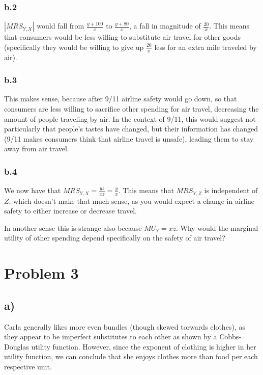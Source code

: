 \documentclass[12pt,letterpaper]{article}
\theoremstyle{definition}
\begin{document}
\subsubsection*{b.2}

$|MRS_{Y,X}|$ would fall from $\frac{y+100}{x}$ to $\frac{y+80}{x}$, a fall in magnitude of $\frac{20}{x}$.
This means that consumers would be less willing to substitute air travel for other goods (specifically they would be willing to give up $\frac{20}{x}$ less for an extra mile traveled by air).

\subsubsection*{b.3}

This makes sense, because after 9/11 airline safety would go down, so that consumers are less willing to sacrifice other spending for air travel, decreasing the amount of people traveling by air.
In the context of 9/11, this would suggest not particularly that people's tastes have changed, but their information has changed (9/11 makes consumers think that airline travel is unsafe), leading them to stay away from air travel.

\subsubsection*{b.4}

We now have that $MRS_{Y,X} = \frac{yz}{xz} = \frac{y}{x}$. This means that $MRS_{Y,Z}$ is independent of $Z$, which doesn't make that much sense, as you would expect a change in airline safety to either increase or decrease travel. 

In another sense this is strange also because $MU_Y = xz$. Why would the marginal utility of other spending depend specifically on the safety of air travel?

\section*{Problem 3}
\subsection*{a)}

Carla generally likes more even bundles (though skewed torwards clothes), as they appear to be imperfect substitutes to each other as shown by a Cobbs-Douglas utility function. However, since the exponent of clothing is higher in her utility function, we can conclude that she enjoys clothes more than food per each respective unit.
\end{document}
